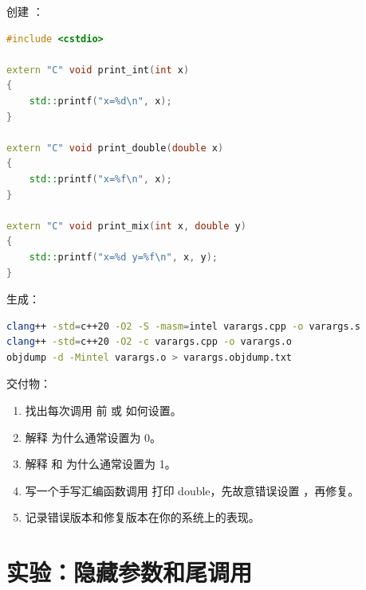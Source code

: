 \begin{labbox}
创建 ：

\begin{lstlisting}[language=C++]
#include <cstdio>

extern "C" void print_int(int x)
{
    std::printf("x=%d\n", x);
}

extern "C" void print_double(double x)
{
    std::printf("x=%f\n", x);
}

extern "C" void print_mix(int x, double y)
{
    std::printf("x=%d y=%f\n", x, y);
}
\end{lstlisting}

生成：

\begin{lstlisting}[language=bash]
clang++ -std=c++20 -O2 -S -masm=intel varargs.cpp -o varargs.s
clang++ -std=c++20 -O2 -c varargs.cpp -o varargs.o
objdump -d -Mintel varargs.o > varargs.objdump.txt
\end{lstlisting}

交付物：

\begin{enumerate}
  \item 找出每次调用  前  或  如何设置。
  \item 解释  为什么通常设置为 0。
  \item 解释  和  为什么通常设置为 1。
  \item 写一个手写汇编函数调用  打印 double，先故意错误设置 ，再修复。
  \item 记录错误版本和修复版本在你的系统上的表现。
\end{enumerate}
\end{labbox}

\section{实验：隐藏参数和尾调用}

